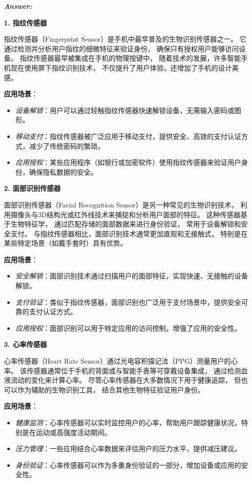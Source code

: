 \documentclass[12pt]{article}
\newenvironment{Answer}{
  \vspace{12pt}
  {\large\textbf{\textit{\hspace{-12pt}Answer:}}}\par
  \vspace{8pt}
} {\vspace{24pt}}
\begin{document}
\begin{Answer}
\noindent\textbf{1. 指纹传感器}\noindent

指纹传感器（Fingerprint Sensor）是手机中最早普及的生物识别传感器之一。
它通过检测并分析用户指纹的细微特征来验证身份，
确保只有授权用户能够访问设备。
指纹传感器最早被集成在手机的物理按键中，
随着技术的发展，许多智能手机现在使用屏下指纹识别技术，
不仅提升了用户体验，还增加了手机的设计美感。

\textbf{应用场景}：
\begin{itemize}
    \item \textit{设备解锁}：用户可以通过轻触指纹传感器快速解锁设备，无需输入密码或图形。
    \item \textit{移动支付}：指纹传感器被广泛应用于移动支付，提供安全、高效的支付认证方式，减少了传统密码的繁琐。
    \item \textit{应用授权}：某些应用程序（如银行或加密软件）使用指纹传感器来验证用户身份，确保隐私数据的安全。
\end{itemize}

\noindent\textbf{2. 面部识别传感器}\noindent

面部识别传感器（Facial Recognition Sensor）是另一种常见的生物识别技术，
利用摄像头与3D结构光或红外线技术来捕捉和分析用户面部的特征。
这种传感器基于生物特征学，
通过匹配存储的面部数据来进行身份验证，
常用于设备解锁和安全支付。
与指纹传感器相比，面部识别技术通常更加直观和无接触式，
特别是在某些特定场景（如戴手套时）具有优势。

\textbf{应用场景}：
\begin{itemize}
    \item \textit{安全解锁}：面部识别技术通过扫描用户的面部特征，实现快速、无接触的设备解锁。
    \item \textit{支付验证}：类似于指纹传感器，面部识别也广泛用于支付场景中，提供安全可靠的支付认证方式。
    \item \textit{应用授权}：面部识别可以用于特定应用的访问控制，增强了应用的安全性。
\end{itemize}

\noindent\textbf{3. 心率传感器}\noindent

心率传感器（Heart Rate Sensor）通过光电容积描记法（PPG）测量用户的心率。
该传感器通常位于手机的背面或与智能手表等可穿戴设备集成，
通过检测血液流动的变化来计算心率。
尽管心率传感器在大多数情况下用于健康追踪，
但也可以作为辅助的生物识别工具，
结合其他生物特征验证用户身份。

\textbf{应用场景}：
\begin{itemize}
    \item \textit{健康监测}：心率传感器可以实时监控用户的心率，帮助用户跟踪健康状况，特别是在运动或高强度活动期间。
    \item \textit{压力管理}：一些应用结合心率数据来评估用户的压力水平，提供减压建议。
    \item \textit{身份验证}：心率传感器可以作为多重身份验证的一部分，增加设备或应用的安全性。
\end{itemize}


\end{Answer}
\end{document}
